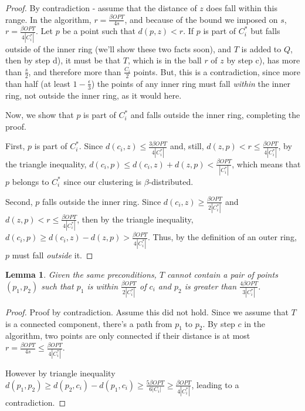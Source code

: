 \documentclass[paper=a4, fontsize=10.5pt]{scrartcl} %
\numberwithin{equation}{section} %
\numberwithin{figure}{section} %
\numberwithin{table}{section} %
\newtheorem{lemma}[theorem]{Lemma}
\begin{document}
\begin{proof}
By contradiction - assume that the distance of $z$ does fall within this range.  In the algorithm, $r = \frac{\beta OPT}{4 s}$, and because of the bound we imposed on $s$, $r = \frac{\beta OPT}{4 |C^*_i|}$.  Let $p$ be a point such that $d(p, z) < r$.  If $p$ is part of $C^*_i$ but falls outside of the inner ring (we'll show these two facts soon), and $T$ is added to $Q$, then by step d), it must be that $T$, which is in the ball $r$ of $z$ by step c), has more than $\frac{s}{2}$, and therefore more than $\frac{C_i}{2}$ points.  But, this is a contradiction, since more than half (at least $1 - \frac{\epsilon}{3}$) the points of any inner ring must fall \emph{within} the inner ring, not outside the inner ring, as it would here.

Now, we show that $p$ is part of $C^*_i$ and falls outside the inner ring, completing the proof.  

First, $p$ is part of $C^*_i$.  Since $d(c_i, z) \leq \frac{3 \beta OPT}{4 |C^*_i|}$ and, still, $d(z, p) < r \leq \frac{\beta OPT}{4 |C^*_i|}$, by the triangle inequality, $d(c_i, p) \leq d(c_i, z) + d(z, p) < \frac{\beta OPT}{|C^*_i|}$, which means that $p$ belongs to $C^*_i$ since our clustering is $\beta$-distributed.

Second, $p$ falls outside the inner ring.  Since $d(c_i, z) \geq \frac{\beta OPT}{2 |C^*_i|}$ and $d(z, p) < r \leq \frac{\beta OPT}{4 |C^*_i|}$, then by the triangle inequality, $d(c_i, p) \geq d(c_i, z) - d(z, p) > \frac{\beta OPT}{4 |C^*_i|}$. Thus, by the definition of an outer ring, $p$ must fall \emph{outside} it.

\end{proof}

\begin{lemma}
Given the same preconditions, $T$ cannot contain a pair of points $(p_1, p_2)$ such that $p_1$ is within $\frac{\beta OPT}{2 |C^*_i|}$ of $c_i$ and $p_2$ is greater than $\frac{4 \beta OPT}{3 |C^*_i|}$.
\label{lemma:4.2b}
\end{lemma}

\begin{proof}
Proof by contradiction.  Assume this did not hold.  Since we assume that $T$ is a connected component, there's a path from $p_1$ to $p_2$.  By step $c$ in the algorithm, two points are only connected if their distance is at most $r = \frac{\beta OPT}{4s} \leq \frac{\beta OPT}{4|C^*_i|}$.

However by triangle inequality $d(p_1, p_2) \geq d(p_2, c_i) - d(p_1, c_i) \geq \frac{5\beta OPT}{6|C_i|} \geq \frac{\beta OPT}{4|C^*_i|}$, leading to a contradiction. 

\end{proof}
\end{document}
